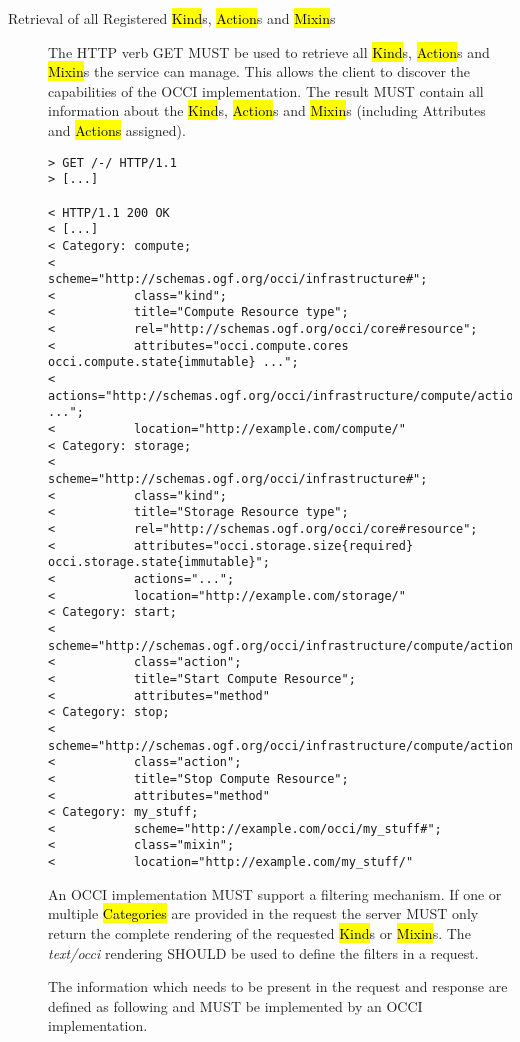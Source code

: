 \documentclass[10pt,a4paper]{article}
\begin{document}
\begin{description}
  \item[Retrieval of all Registered \hl{Kind}s, \hl{Action}s and
    \hl{Mixin}s] The HTTP verb GET MUST be used to retrieve all
    \hl{Kind}s, \hl{Action}s and \hl{Mixin}s the service can
    manage. This allows the client to discover the capabilities of the
    OCCI implementation. The result MUST contain all information about
    the \hl{Kind}s, \hl{Action}s and \hl{Mixin}s (including Attributes
    and \hl{Actions} assigned).

\begin{verbatim}
> GET /-/ HTTP/1.1
> [...]

< HTTP/1.1 200 OK
< [...]
< Category: compute;
<           scheme="http://schemas.ogf.org/occi/infrastructure#";
<           class="kind";
<           title="Compute Resource type";
<           rel="http://schemas.ogf.org/occi/core#resource";
<           attributes="occi.compute.cores occi.compute.state{immutable} ...";
<           actions="http://schemas.ogf.org/occi/infrastructure/compute/action#stop ...";
<           location="http://example.com/compute/"
< Category: storage;
<           scheme="http://schemas.ogf.org/occi/infrastructure#";
<           class="kind";
<           title="Storage Resource type";
<           rel="http://schemas.ogf.org/occi/core#resource";
<           attributes="occi.storage.size{required} occi.storage.state{immutable}";
<           actions="...";
<           location="http://example.com/storage/"
< Category: start;
<           scheme="http://schemas.ogf.org/occi/infrastructure/compute/action#";
<           class="action";
<           title="Start Compute Resource";
<           attributes="method"
< Category: stop;
<           scheme="http://schemas.ogf.org/occi/infrastructure/compute/action#";
<           class="action";
<           title="Stop Compute Resource";
<           attributes="method"
< Category: my_stuff;
<           scheme="http://example.com/occi/my_stuff#";
<           class="mixin";
<           location="http://example.com/my_stuff/"
\end{verbatim}

    An OCCI implementation MUST support a filtering mechanism. If one
    or multiple \hl{Categories} are provided in the request the server
    MUST only return the complete rendering of the requested
    \hl{Kind}s or \hl{Mixin}s. The \emph{text/occi} rendering SHOULD
    be used to define the filters in a request.

    The information which needs to be present in the request and
    response are defined as following and MUST be implemented by an
    OCCI implementation.


\end{description}
\end{document}
